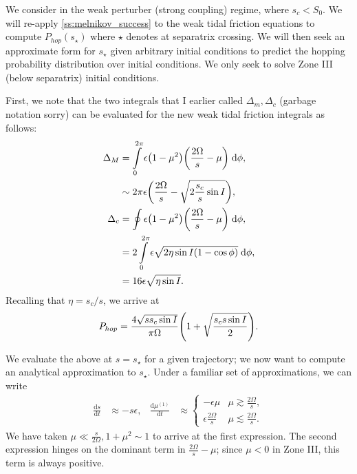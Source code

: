 \documentclass[11pt,
        usenames, %
        dvipsnames %
    ]{article}
\newcommand*{\rd}[2]{\frac{\mathrm{d}#1}{\mathrm{d}#2}}
\DeclarePairedDelimiter\p{\lparen}{\rparen}
\begin{document}
We consider in the weak perturber (strong coupling) regime, where $s_c < S_0$.
We will re-apply \autoref{ss:melnikov_success} to the weak tidal friction
equations to compute $P_{hop}(s_\star)$ where $\star$ denotes at separatrix
crossing. We will then seek an approximate form for $s_{\star}$ given arbitrary
initial conditions to predict the hopping probability distribution over initial
conditions. We only seek to solve Zone III (below separatrix) initial
conditions.

First, we note that the two integrals that I earlier called $\Delta_m, \Delta_c$
(garbage notation sorry) can be evaluated for the new weak tidal friction
integrals as follows:
\begin{align}
    \Delta_M &= \int\limits_0^{2\pi}\epsilon\p*{1 - \mu^2}
            \p*{\frac{2\Omega}{s} - \mu} \;\mathrm{d}\phi,\nonumber\\
        &\sim 2\pi \epsilon \p*{\frac{2\Omega}{s}
            - \sqrt{2\frac{s_c}{s}\sin I}},\\
    \Delta_c &= \oint \epsilon \p*{1 - \mu^2}\p*{\frac{2\Omega}{s} - \mu}
            \;\mathrm{d}\phi,\nonumber\\
        &= 2\int\limits_0^{2\pi}
            \epsilon\sqrt{2\eta \sin I\p*{1 - \cos \phi}}\;\mathrm{d}\phi
            ,\nonumber\\
        &= 16\epsilon\sqrt{\eta \sin I}.
\end{align}
Recalling that $\eta = s_c/s$, we arrive at
\begin{equation}
    P_{hop} = \frac{4\sqrt{ss_c\sin I}}{\pi \Omega}
        \p*{1 + \sqrt{\frac{s_cs\sin I}{2}}}.\label{eq:p_hop_sqrt_s}
\end{equation}

We evaluate the above at $s = s_\star$ for a given trajectory; we now want to
compute an analytical approximation to $s_\star$. Under a familiar set of
approximations, we can write
\begin{align*}
    \rd{s}{t} &\approx -s\epsilon,&
    \rd{\mu^{(1)}}{t} &\approx
    \begin{cases}
        -\epsilon\mu & \mu \gtrsim \frac{2\Omega}{s},\\
        \epsilon\frac{2\Omega}{s} & \mu \lesssim \frac{2\Omega}{s}.
    \end{cases}
\end{align*}
We have taken $\mu \ll \frac{s}{2\Omega}, 1 + \mu^2 \sim 1$ to arrive at the
first expression. The second expression hinges on the dominant term in
$\frac{2\Omega}{s} - \mu$; since $\mu < 0$ in Zone III, this term is always
positive.
\end{document}
